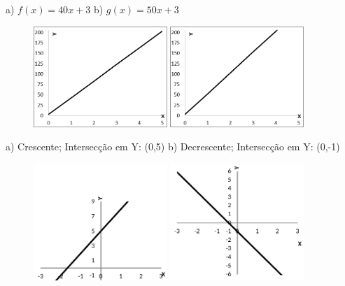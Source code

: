 \begin{respostas}{3}
\ansitem{} a)  \( f \left( x \right) =40x+3 \)  \qquad b)  \( g \left( x \right) =50x+3 \) 

\begin{figure}[H]
	\includegraphics[width=0.45\textwidth]{capitulos/funcao_do_primeiro_grau/media/image55.png} 
	\includegraphics[width=0.45\textwidth]{capitulos/funcao_do_primeiro_grau/media/image56.png}
\end{figure}

\ansitem{} a) Crescente; Intersecção em Y: (0,5) \qquad b) Decrescente; Intersecção em Y: (0,-1)

\begin{figure}[H]
	\includegraphics[width=0.45\textwidth]{capitulos/funcao_do_primeiro_grau/media/image57.pdf} 
	\includegraphics[width=0.45\textwidth]{capitulos/funcao_do_primeiro_grau/media/image58.pdf}
\end{figure}


\end{respostas}
